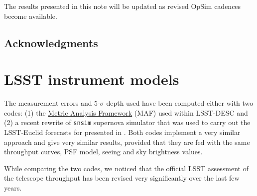 \documentclass[\docopts]{\docclass}
\begin{document}
The results presented in this note will be updated as revised OpSim
cadences become available.



\subsection*{Acknowledgments}


% 

% 








\appendix

\section{LSST instrument models}
\label{sec:lsst_instrument_models}

The measurement errors and 5-$\sigma$ depth used have been computed
either with two codes: (1) the
\href{https://www.lsst.org/scientists/simulations/maf}{Metric Analysis
  Framework} (MAF) used within LSST-DESC and (2) a recent rewrite of
{\tt snsim} supernova simulator that was used to carry out the
LSST-Euclid forecasts for presented in \cite{2014A&A...572A..80A}.
Both codes implement a very similar approach and give very similar
results, provided that they are fed with the same throughput curves,
PSF model, seeing and sky brightness values.

While comparing the two codes, we noticed that the official LSST
assessment of the telescope throughput has been revised very
significantly over the last few years. 
\end{document}
